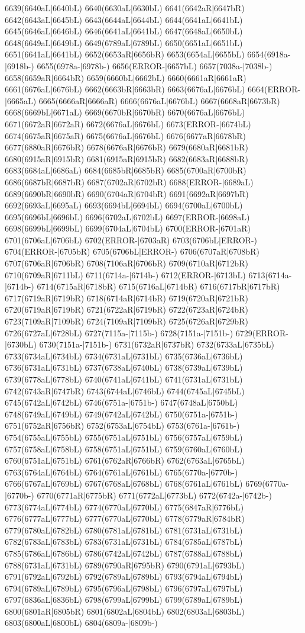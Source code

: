 6639(6640aL|6640bL) 6640(6630aL|6630bL) 6641(6642aR|6647bR) 6642(6643aL|6645bL) 6643(6644aL|6644bL) 6644(6641aL|6641bL) 6645(6646aL|6646bL) 6646(6641aL|6641bL) 6647(6648aL|6650bL) 6648(6649aL|6649bL) 6649(6789aL|6789bL) 6650(6651aL|6651bL) 6651(6641aL|6641bL) 6652(6653aR|6656bR) 6653(6654aL|6655bL) 6654(6918a-|6918b-) 6655(6978a-|6978b-) 6656(ERROR-|6657bL) 6657(7038a-|7038b-) 6658(6659aR|6664bR) 6659(6660bL|6662bL) 6660(6661aR|6661aR) 6661(6676aL|6676bL) 6662(6663bR|6663bR) 6663(6676aL|6676bL) 6664(ERROR-|6665aL) 6665(6666aR|6666aR) 6666(6676aL|6676bL) 6667(6668aR|6673bR) 6668(6669bL|6671aL) 6669(6670bR|6670bR) 6670(6676aL|6676bL) 6671(6672aR|6672aR) 6672(6676aL|6676bL) 6673(ERROR-|6674bL) 6674(6675aR|6675aR) 6675(6676aL|6676bL) 6676(6677aR|6678bR) 6677(6880aR|6676bR) 6678(6676aR|6676bR) 6679(6680aR|6681bR) 6680(6915aR|6915bR) 6681(6915aR|6915bR) 6682(6683aR|6688bR) 6683(6684aL|6686aL) 6684(6685bR|6685bR) 6685(6700aR|6700bR) 6686(6687bR|6687bR) 6687(6702aR|6702bR) 6688(ERROR-|6689aL) 6689(6690bR|6690bR) 6690(6704aR|6704bR) 6691(6692aR|6697bR) 6692(6693aL|6695aL) 6693(6694bL|6694bL) 6694(6700aL|6700bL) 6695(6696bL|6696bL) 6696(6702aL|6702bL) 6697(ERROR-|6698aL) 6698(6699bL|6699bL) 6699(6704aL|6704bL) 6700(ERROR-|6701aR) 6701(6706aL|6706bL) 6702(ERROR-|6703aR) 6703(6706bL|ERROR-) 6704(ERROR-|6705bR) 6705(6706bL|ERROR-) 6706(6707aR|6708bR) 6707(6706aR|6706bR) 6708(7106aR|6706bR) 6709(6710aR|6712bR) 6710(6709aR|6711bL) 6711(6714a-|6714b-) 6712(ERROR-|6713bL) 6713(6714a-|6714b-) 6714(6715aR|6718bR) 6715(6716aL|6714bR) 6716(6717bR|6717bR) 6717(6719aR|6719bR) 6718(6714aR|6714bR) 6719(6720aR|6721bR) 6720(6719aR|6719bR) 6721(6722aR|6719bR) 6722(6723aR|6724bR) 6723(7109aR|7109bR) 6724(7109aR|7109bR) 6725(6726aR|6729bR) 6726(6727aL|6728bL) 6727(7115a-|7115b-) 6728(7151a-|7151b-) 6729(ERROR-|6730bL) 6730(7151a-|7151b-) 6731(6732aR|6737bR) 6732(6733aL|6735bL) 6733(6734aL|6734bL) 6734(6731aL|6731bL) 6735(6736aL|6736bL) 6736(6731aL|6731bL) 6737(6738aL|6740bL) 6738(6739aL|6739bL) 6739(6778aL|6778bL) 6740(6741aL|6741bL) 6741(6731aL|6731bL) 6742(6743aR|6747bR) 6743(6744aL|6746bL) 6744(6745aL|6745bL) 6745(6742aL|6742bL) 6746(6751a-|6751b-) 6747(6748aL|6750bL) 6748(6749aL|6749bL) 6749(6742aL|6742bL) 6750(6751a-|6751b-) 6751(6752aR|6756bR) 6752(6753aL|6754bL) 6753(6761a-|6761b-) 6754(6755aL|6755bL) 6755(6751aL|6751bL) 6756(6757aL|6759bL) 6757(6758aL|6758bL) 6758(6751aL|6751bL) 6759(6760aL|6760bL) 6760(6751aL|6751bL) 6761(6762aR|6766bR) 6762(6763aL|6765bL) 6763(6764aL|6764bL) 6764(6761aL|6761bL) 6765(6770a-|6770b-) 6766(6767aL|6769bL) 6767(6768aL|6768bL) 6768(6761aL|6761bL) 6769(6770a-|6770b-) 6770(6771aR|6775bR) 6771(6772aL|6773bL) 6772(6742a-|6742b-) 6773(6774aL|6774bL) 6774(6770aL|6770bL) 6775(6847aR|6776bL) 6776(6777aL|6777bL) 6777(6770aL|6770bL) 6778(6779aR|6784bR) 6779(6780aL|6782bL) 6780(6781aL|6781bL) 6781(6731aL|6731bL) 6782(6783aL|6783bL) 6783(6731aL|6731bL) 6784(6785aL|6787bL) 6785(6786aL|6786bL) 6786(6742aL|6742bL) 6787(6788aL|6788bL) 6788(6731aL|6731bL) 6789(6790aR|6795bR) 6790(6791aL|6793bL) 6791(6792aL|6792bL) 6792(6789aL|6789bL) 6793(6794aL|6794bL) 6794(6789aL|6789bL) 6795(6796aL|6798bL) 6796(6797aL|6797bL) 6797(6836aL|6836bL) 6798(6799aL|6799bL) 6799(6789aL|6789bL) 6800(6801aR|6805bR) 6801(6802aL|6804bL) 6802(6803aL|6803bL) 6803(6800aL|6800bL) 6804(6809a-|6809b-) 